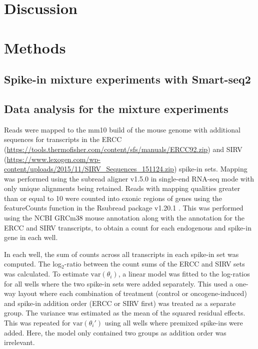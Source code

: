 \documentclass{article}
\begin{document}
\section{Discussion}

\section{Methods}

\subsection{Spike-in mixture experiments with Smart-seq2}

\subsection{Data analysis for the mixture experiments}
Reads were mapped to the mm10 build of the mouse genome with additional sequences for transcripts in the ERCC (\url{https://tools.thermofisher.com/content/sfs/manuals/ERCC92.zip}) and SIRV (\url{https://www.lexogen.com/wp-content/uploads/2015/11/SIRV_Sequences_151124.zip}) spike-in sets.
Mapping was performed using the subread aligner v1.5.0 \cite{liao2013subread} in single-end RNA-seq mode with only unique alignments being retained.
Reads with mapping qualities greater than or equal to 10 were counted into exonic regions of genes using the featureCounts function in the Rsubread package v1.20.1 \cite{liao2014featurecounts}.
This was performed using the NCBI GRCm38 mouse annotation along with the annotation for the ERCC and SIRV transcripts, to obtain a count for each endogenous and spike-in gene in each well.

In each well, the sum of counts across all transcripts in each spike-in set was computed.
The log$_2$-ratio between the count sums of the ERCC and SIRV sets was calculated.
To estimate $\mbox{var}(\theta_i)$, a linear model was fitted to the log-ratios for all wells where the two spike-in sets were added separately.
This used a one-way layout where each combination of treatment (control or oncogene-induced) and spike-in addition order (ERCC or SIRV first) was treated as a separate group.
The variance was estimated as the mean of the squared residual effects.
This was repeated for $\mbox{var}(\theta_i')$ using all wells where premixed spike-ins were added.
Here, the model only contained two groups as addition order was irrelevant.
\end{document}
